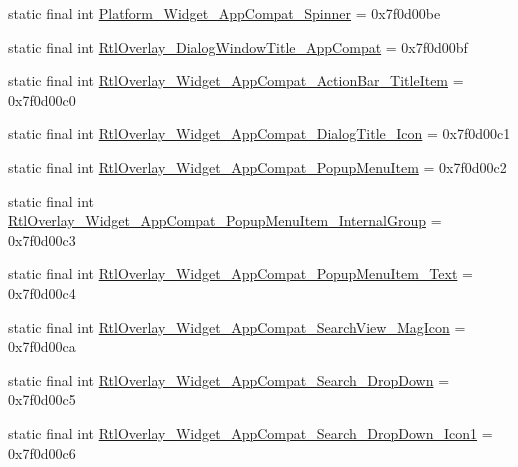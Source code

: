 \begin{DoxyCompactItemize}
\item 
static final int \mbox{\hyperlink{classandroid_1_1support_1_1v7_1_1appcompat_1_1R_1_1style_a90ab46cdb3f297b8f5078a63d4c05b7f}{Platform\+\_\+\+Widget\+\_\+\+App\+Compat\+\_\+\+Spinner}} = 0x7f0d00be
\item 
static final int \mbox{\hyperlink{classandroid_1_1support_1_1v7_1_1appcompat_1_1R_1_1style_a9afb3efc2ad067987863fcb4c137113a}{Rtl\+Overlay\+\_\+\+Dialog\+Window\+Title\+\_\+\+App\+Compat}} = 0x7f0d00bf
\item 
static final int \mbox{\hyperlink{classandroid_1_1support_1_1v7_1_1appcompat_1_1R_1_1style_a8126b14ed95f0bc8e4bfb220e9da09bd}{Rtl\+Overlay\+\_\+\+Widget\+\_\+\+App\+Compat\+\_\+\+Action\+Bar\+\_\+\+Title\+Item}} = 0x7f0d00c0
\item 
static final int \mbox{\hyperlink{classandroid_1_1support_1_1v7_1_1appcompat_1_1R_1_1style_a0e4154ec705b54236d1e38b0d65755f7}{Rtl\+Overlay\+\_\+\+Widget\+\_\+\+App\+Compat\+\_\+\+Dialog\+Title\+\_\+\+Icon}} = 0x7f0d00c1
\item 
static final int \mbox{\hyperlink{classandroid_1_1support_1_1v7_1_1appcompat_1_1R_1_1style_ae1bae14f1eb7c8efb1126019df2b46c5}{Rtl\+Overlay\+\_\+\+Widget\+\_\+\+App\+Compat\+\_\+\+Popup\+Menu\+Item}} = 0x7f0d00c2
\item 
static final int \mbox{\hyperlink{classandroid_1_1support_1_1v7_1_1appcompat_1_1R_1_1style_a8de9fa977b83ffcd83f9d6c0f210664d}{Rtl\+Overlay\+\_\+\+Widget\+\_\+\+App\+Compat\+\_\+\+Popup\+Menu\+Item\+\_\+\+Internal\+Group}} = 0x7f0d00c3
\item 
static final int \mbox{\hyperlink{classandroid_1_1support_1_1v7_1_1appcompat_1_1R_1_1style_a27940d2a97fcebbe0e833376ce4c05fc}{Rtl\+Overlay\+\_\+\+Widget\+\_\+\+App\+Compat\+\_\+\+Popup\+Menu\+Item\+\_\+\+Text}} = 0x7f0d00c4
\item 
static final int \mbox{\hyperlink{classandroid_1_1support_1_1v7_1_1appcompat_1_1R_1_1style_af86deaaeed3a6ce46e3164ddfecf1dc4}{Rtl\+Overlay\+\_\+\+Widget\+\_\+\+App\+Compat\+\_\+\+Search\+View\+\_\+\+Mag\+Icon}} = 0x7f0d00ca
\item 
static final int \mbox{\hyperlink{classandroid_1_1support_1_1v7_1_1appcompat_1_1R_1_1style_a5e5fdfffdb11d965c660ba127baa6384}{Rtl\+Overlay\+\_\+\+Widget\+\_\+\+App\+Compat\+\_\+\+Search\+\_\+\+Drop\+Down}} = 0x7f0d00c5
\item 
static final int \mbox{\hyperlink{classandroid_1_1support_1_1v7_1_1appcompat_1_1R_1_1style_ab2fa2b3005166cd16d6868de78bf4747}{Rtl\+Overlay\+\_\+\+Widget\+\_\+\+App\+Compat\+\_\+\+Search\+\_\+\+Drop\+Down\+\_\+\+Icon1}} = 0x7f0d00c6

\end{DoxyCompactItemize}
